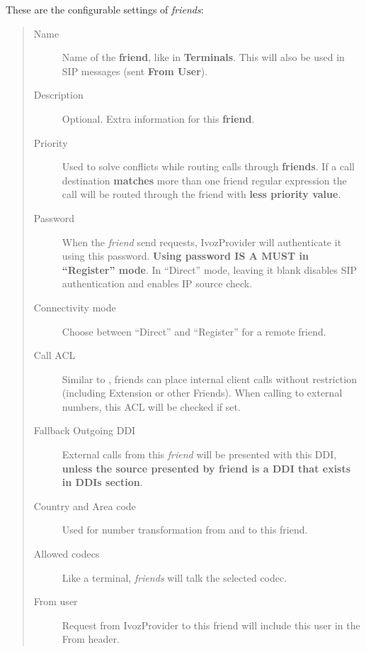 \documentclass[letterpaper,10pt,english]{sphinxmanual}
\begin{document}
These are the configurable settings of \emph{friends}:
\begin{quote}
\begin{description}
\item[{Name}] \leavevmode
Name of the \textbf{friend}, like in \textbf{Terminals}. This will also be used
in SIP messages (sent \textbf{From User}).

\item[{Description}] \leavevmode
Optional. Extra information for this \textbf{friend}.

\item[{Priority}] \leavevmode
Used to solve conflicts while routing calls through \textbf{friends}.
If a call destination \textbf{matches} more than one friend regular expression
the call will be routed through the friend with \textbf{less priority value}.

\item[{Password}] \leavevmode
When the \emph{friend} send requests, IvozProvider will authenticate it using
this password. \textbf{Using password IS A MUST in ``Register'' mode}. In ``Direct'' mode,
leaving it blank disables SIP authentication and enables IP source check.

\item[{Connectivity mode}] \leavevmode
Choose between ``Direct'' and ``Register'' for a remote friend.

\item[{Call ACL}] \leavevmode
Similar to {\hyperref[administration_portal/client/vpbx/users:users]{}}, friends can place internal
client calls without restriction (including Extension or other Friends).
When calling to external numbers, this ACL will be checked if set.

\item[{Fallback Outgoing DDI}] \leavevmode
External calls from this \emph{friend} will be presented with this DDI, \textbf{unless
the source presented by friend is a DDI that exists in DDIs section}.

\item[{Country and Area code}] \leavevmode
Used for number transformation from and to this friend.

\item[{Allowed codecs}] \leavevmode
Like a terminal, \emph{friends} will talk the selected codec.

\item[{From user}] \leavevmode
Request from IvozProvider to this friend will include this user in
the From header.


\end{description}
\end{quote}
\end{document}
